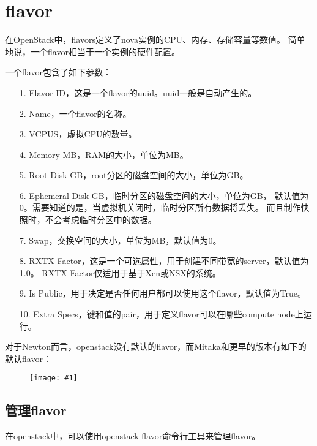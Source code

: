 \documentclass[a4paper,left=1.5cm,right=1.5cm,11pt]{article}
\newcommand{\fic}[1]{\begin{figure}[H]
		\center
		\texttt{[image: \#1]}
	\end{figure}}
\begin{document}
    
\section{flavor}
    在OpenStack中，flavors定义了nova实例的CPU、内存、存储容量等数值。
    简单地说，一个flavor相当于一个实例的硬件配置。\par

    一个flavor包含了如下参数：
    \begin{itemize}
        \item[1.] Flavor ID，这是一个flavor的uuid。uuid一般是自动产生的。
        \item[2.] Name，一个flavor的名称。
        \item[3.] VCPUS，虚拟CPU的数量。
        \item[4.] Memory MB，RAM的大小，单位为MB。
        \item[5.] Root Disk GB，root分区的磁盘空间的大小，单位为GB。
        \item[6.] Ephemeral Disk GB，临时分区的磁盘空间的大小，单位为GB，
                  默认值为0。需要知道的是，当虚拟机关闭时，临时分区所有数据将丢失。
                  而且制作快照时，不会考虑临时分区中的数据。
        \item[7.] Swap，交换空间的大小，单位为MB，默认值为0。
        \item[8.] RXTX Factor，这是一个可选属性，用于创建不同带宽的server，默认值为1.0。
                  RXTX Factor仅适用于基于Xen或NSX的系统。
        \item[9.] Is Public，用于决定是否任何用户都可以使用这个flavor，默认值为True。
        \item[10.] Extra Specs，键和值的pair，用于定义flavor可以在哪些compute node上运行。
    \end{itemize}

    对于Newton而言，openstack没有默认的flavor，而Mitaka和更早的版本有如下的默认flavor：
    \fic{1.png}

\subsection{管理flavor}
    在openstack中，可以使用openstack flavor命令行工具来管理flavor。\par
\end{document}
